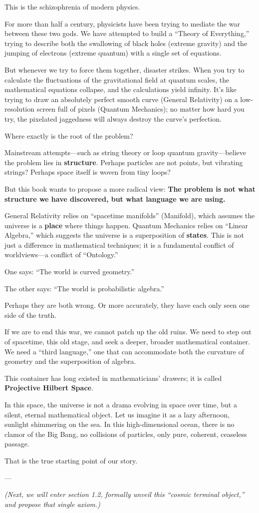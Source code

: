 This is the schizophrenia of modern physics.

For more than half a century, physicists have been trying to mediate the war between these two gods. We have attempted to build a ``Theory of Everything,'' trying to describe both the swallowing of black holes (extreme gravity) and the jumping of electrons (extreme quantum) with a single set of equations.

But whenever we try to force them together, disaster strikes. When you try to calculate the fluctuations of the gravitational field at quantum scales, the mathematical equations collapse, and the calculations yield infinity. It's like trying to draw an absolutely perfect smooth curve (General Relativity) on a low-resolution screen full of pixels (Quantum Mechanics); no matter how hard you try, the pixelated jaggedness will always destroy the curve's perfection.

Where exactly is the root of the problem?

Mainstream attempts---such as string theory or loop quantum gravity---believe the problem lies in \textbf{structure}. Perhaps particles are not points, but vibrating strings? Perhaps space itself is woven from tiny loops?

But this book wants to propose a more radical view: \textbf{The problem is not what structure we have discovered, but what language we are using.}

General Relativity relies on ``spacetime manifolds'' (Manifold), which assumes the universe is a \textbf{place} where things happen. Quantum Mechanics relies on ``Linear Algebra,'' which suggests the universe is a superposition of \textbf{states}. This is not just a difference in mathematical techniques; it is a fundamental conflict of worldviews---a conflict of ``Ontology.''

One says: ``The world is curved geometry.''

The other says: ``The world is probabilistic algebra.''

Perhaps they are both wrong. Or more accurately, they have each only seen one side of the truth.

If we are to end this war, we cannot patch up the old ruins. We need to step out of spacetime, this old stage, and seek a deeper, broader mathematical container. We need a ``third language,'' one that can accommodate both the curvature of geometry and the superposition of algebra.

This container has long existed in mathematicians' drawers; it is called \textbf{Projective Hilbert Space}.

In this space, the universe is not a drama evolving in space over time, but a silent, eternal mathematical object. Let us imagine it as a lazy afternoon, sunlight shimmering on the sea. In this high-dimensional ocean, there is no clamor of the Big Bang, no collisions of particles, only pure, coherent, ceaseless passage.

That is the true starting point of our story.

---

\textit{(Next, we will enter section 1.2, formally unveil this ``cosmic terminal object,'' and propose that single axiom.)}

